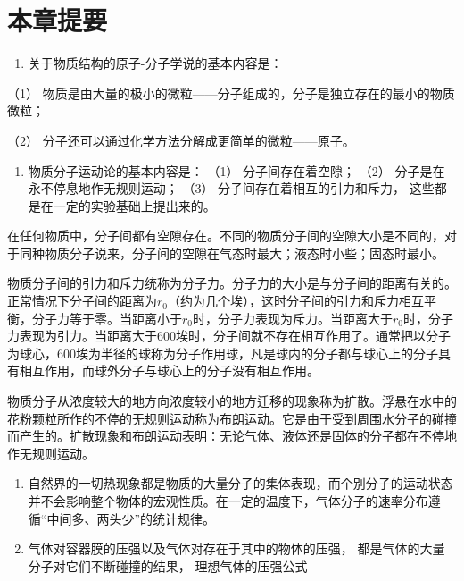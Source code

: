 \section{本章提要}\label{ux672cux7ae0ux63d0ux8981-5}

\begin{enumerate}
\def\labelenumi{\arabic{enumi}.}
\tightlist
\item
  关于物质结构的原子-分子学说的基本内容是：
\end{enumerate}

（1）
物质是由大量的极小的微粒------分子组成的，分子是独立存在的最小的物质微粒；

（2） 分子还可以通过化学方法分解成更简单的微粒------原子。

\begin{enumerate}
\def\labelenumi{\arabic{enumi}.}
\setcounter{enumi}{1}
\tightlist
\item
  物质分子运动论的基本内容是： （1） 分子间存在着空隙； （2）
  分子是在永不停息地作无规则运动； （3） 分子间存在着相互的引力和斥力，
  这些都是在一定的实验基础上提出来的。
\end{enumerate}

在任何物质中，分子间都有空隙存在。不同的物质分子间的空隙大小是不同的，对于同种物质分子说来，分子间的空隙在气态时最大；液态时小些；固态时最小。

物质分子间的引力和斥力统称为分子力。分子力的大小是与分子间的距离有关的。正常情况下分子间的距离为\(r_0\)（约为几个埃），这时分子间的引力和斥力相互平衡，分子力等于零。当距离小于\(r_0\)时，分子力表现为斥力。当距离大于\(r_0\)时，分子力表现为引力。当距离大于600埃时，分子间就不存在相互作用了。通常把以分子为球心，600埃为半径的球称为分子作用球，凡是球内的分子都与球心上的分子具有相互作用，而球外分子与球心上的分子没有相互作用。

物质分子从浓度较大的地方向浓度较小的地方迁移的现象称为扩散。浮悬在水中的花粉颗粒所作的不停的无规则运动称为布朗运动。它是由于受到周围水分子的碰撞而产生的。扩散现象和布朗运动表明：无论气体、液体还是固体的分子都在不停地作无规则运动。

\begin{enumerate}
\def\labelenumi{\arabic{enumi}.}
\setcounter{enumi}{2}
\item
  自然界的一切热现象都是物质的大量分子的集体表现，而个别分子的运动状态并不会影响整个物体的宏观性质。在一定的温度下，气体分子的速率分布遵循``中间多、两头少''的统计规律。
\item
  气体对容器膜的压强以及气体对存在于其中的物体的压强，
  都是气体的大量分子对它们不断碰撞的结果， 理想气体的压强公式
\end{enumerate}


